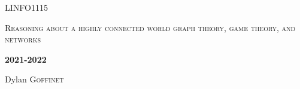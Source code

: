 \documentclass{report}
\begin{document}

\begin{titlepage}
	\centering
	{\scshape\LARGE LINFO1115 \par}
	\vspace{1cm}
	{\scshape\Large Reasoning about a highly connected world graph theory, game theory, and networks \par}
	\vspace{1.5cm}
	{\huge\bfseries 2021-2022\par}
	\vspace{2cm}
	{\Large\itshape\par}
	\vfill
	\vfill
	Dylan \textsc{Goffinet}\par
	{\large \par}
\end{titlepage}


\setcounter{tocdepth}{1} %
\tableofcontents
\clearpage




\end{document}
